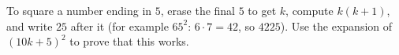 To square a number ending in $5$, erase the final $5$ to get $k$, compute $k(k+1)$, and write $25$ after it (for example $65^2$: $6\cdot7=42$, so $4225$). Use the expansion of $(10k+5)^2$ to prove that this works.
